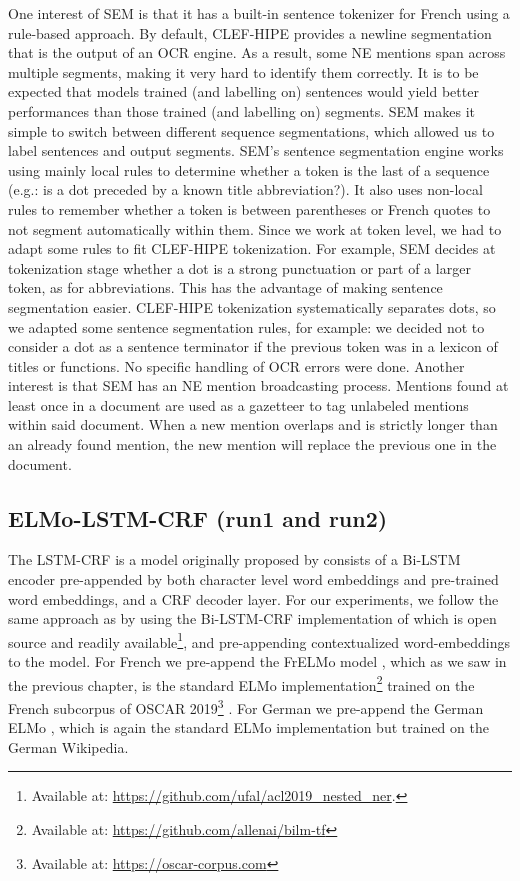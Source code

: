 One interest of SEM is that it has a built-in sentence tokenizer for French using a rule-based approach. By default, CLEF-HIPE provides a newline segmentation that is the output of an OCR engine. As a result, some NE mentions span across multiple segments, making it very hard to identify them correctly. It is to be expected that models trained (and labelling on) sentences would yield better performances than those trained (and labelling on) segments. SEM makes it simple to switch between different sequence segmentations, which allowed us to label sentences and output segments. SEM's sentence segmentation engine works using mainly local rules to determine whether a token is the last of a sequence (e.g.: is a dot preceded by a known title abbreviation?). It also uses non-local rules to remember whether a token is between parentheses or French quotes to not segment automatically within them. Since we work at token level, we had to adapt some rules to fit CLEF-HIPE tokenization. For example, SEM decides at tokenization stage whether a dot is a strong punctuation or part of a larger token, as for abbreviations. This has the advantage of making sentence segmentation easier. CLEF-HIPE tokenization systematically separates dots, so we adapted some sentence segmentation rules, for example: we decided not to consider a dot as a sentence terminator if the previous token was in a lexicon of titles or functions. No specific handling of OCR errors were done. Another interest is that SEM has an NE mention broadcasting process. Mentions found at least once in a document are used as a gazetteer to tag unlabeled mentions within said document. When a new mention overlaps and is strictly longer than an already found mention, the new mention will replace the previous one in the document.

\subsection{ELMo-LSTM-CRF (run1 and run2)}

The LSTM-CRF is a model originally proposed by \citet{lample-etal-2016-neural} consists of a Bi-LSTM encoder pre-appended by both character level word embeddings and pre-trained word embeddings, and a CRF decoder layer. For our experiments, we follow the same approach as \citet{ortiz-suarez-etal-2020-establishing} by using the Bi-LSTM-CRF implementation of \citet{strakova-etal-2019-neural} which is open source and readily available\footnote{Available at: \url{https://github.com/ufal/acl2019_nested_ner}.}, and pre-appending contextualized word-embeddings to the model. For French we pre-append the FrELMo model \citet{ortiz-suarez-etal-2020-establishing}, which as we saw in the previous chapter, is the standard ELMo \citep{peters-etal-2018-deep} implementation\footnote{Available at: \url{https://github.com/allenai/bilm-tf}} trained on the French subcorpus of OSCAR 2019\footnote{Available at: \url{https://oscar-corpus.com}} \citep{ortiz-suarez-etal-2019-asynchronous,ortiz-suarez-etal-2020-monolingual}. For German we pre-append the German ELMo \citep{may-2019-german}, which is again the standard ELMo implementation but trained on the German Wikipedia.

